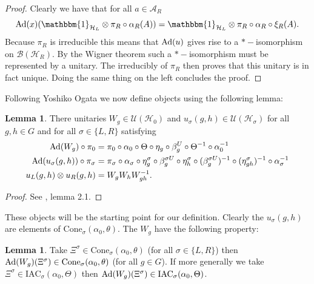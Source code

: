 \documentclass[12pt,a4paper,twoside]{article}
\newcommand{\IAC}{\textrm{IAC}}
\let\originalleft\left
\let\originalright\right
\renewcommand{\left}{\mathopen{}\mathclose\bgroup\originalleft}
\renewcommand{\right}{\aftergroup\egroup\originalright}
\newcommand{\UU}{\mathcal U}
\newcommand{\BB}{\mathcal B}
\newcommand{\HH}{\mathcal H}
\renewcommand{\AA}{\mathcal A}
\newcommand{\id}{\mathbbm{1}}
\newcommand{\Ad}[1]{\textrm{Ad}\left(#1\right)}
\theoremstyle{definition}
\newtheorem{lemma}[theorem]{Lemma}
\numberwithin{equation}{section}
\begin{document}
\begin{proof}
	Clearly we have that for all $a\in\AA_R$
	\begin{equation}
		\Ad{x}(\id_{\HH_L}\otimes \pi_R\circ\alpha_R(A))=\id_{\HH_L}\otimes \pi_R\circ\alpha_R\circ\xi_R(A).
	\end{equation}
	Because $\pi_R$ is irreducible this means that $\Ad{u}$ gives rise to a $*-$isomorphism on $\BB(\HH_R)$. By the Wigner theorem such a $*-$isomorphism must be represented by a unitary. The irreducibly of $\pi_R$ then proves that this unitary is in fact unique. Doing the same thing on the left concludes the proof.
\end{proof}
Following Yoshiko Ogata \cite{ogata2021h3gmathbb} we now define objects using the following lemma:
\begin{lemma}\label{lem:Definition_W_And_u}
	There unitaries $W_g\in\UU(\HH_0)$ and $u_{\sigma}(g,h)\in\UU(\HH_{\sigma})$ for all $g,h\in G$ and for all $\sigma\in\{L,R\}$ satisfying
	\begin{align}
		\Ad{W_g}\circ\pi_0&=\pi_0\circ\alpha_0\circ\Theta\circ\eta_g\circ\beta_g^U\circ\Theta^{-1}\circ\alpha_0^{-1}\\
		\Ad{u_\sigma(g,h)}\circ\pi_\sigma&=\pi_\sigma\circ\alpha_\sigma\circ\eta_g^\sigma\circ\beta_g^{\sigma U}\circ\eta_h^{\sigma}\circ(\beta_g^{\sigma U})^{-1}\circ(\eta^\sigma_{gh})^{-1}\circ\alpha_\sigma^{-1}\\
		u_L(g,h)\otimes u_R(g,h)&=W_gW_hW_{gh}^{-1}.
	\end{align}
\end{lemma}
\begin{proof}
	See \cite{ogata2021h3gmathbb}, lemma 2.1.
\end{proof}
These objects will be the starting point for our definition. Clearly the $u_\sigma(g,h)$ are elements of $\textrm{Cone}_\sigma(\alpha_0,\theta)$. The $W_g$ have the following property:
\begin{lemma}\label{lem:AdjointOverConeIsInCone}
	Take $\Xi^{\sigma}\in\textrm{Cone}_\sigma(\alpha_0,\theta)$ (for all $\sigma\in\{L,R\}$) then $\Ad{W_g}(\Xi^\sigma)\in\textrm{Cone}_\sigma(\alpha_0,\theta)$ (for all $g\in G$).	If more generally we take $\Xi^\sigma\in\IAC_\sigma(\alpha_0,\Theta)$ then $\Ad{W_g}(\Xi^\sigma)\in\IAC_\sigma(\alpha_0,\Theta)$.
\end{lemma}
\end{document}

